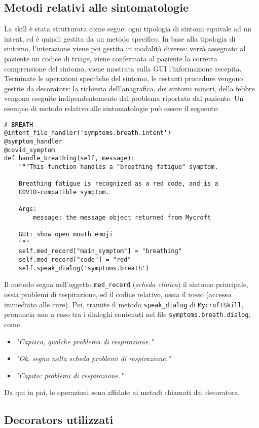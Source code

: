 \subsection{Metodi relativi alle sintomatologie}
La skill è stata strutturata come segue: ogni tipologia di sintomi equivale ad un intent, ed è quindi gestita da un metodo specifico. In base alla tipologia di sintomo, l'interazione viene poi gestita in modalità diverse: verrà assegnato al paziente un codice di triage, viene confermata al paziente la corretta comprensione del sintomo, viene mostrata sulla GUI l'informazione recepita. Terminate le operazioni specifiche del sintomo, le restanti procedure vengono gestite da decorators: la richiesta dell'anagrafica, dei sintomi minori, della febbre vengono eseguite indipendentemente dal problema riportato dal paziente. Un esempio di metodo relativo alle sintomatologie può essere il seguente:
\begin{verbatim}
# BREATH
@intent_file_handler('symptoms.breath.intent')
@symptom_handler
@covid_symptom
def handle_breathing(self, message):
    """This function handles a "breathing fatigue" symptom.

    Breathing fatigue is recognized as a red code, and is a
    COVID-compatible symptom.

    Args:
        message: the message object returned from Mycroft

    GUI: show open mouth emoji
    """
    self.med_record["main_symptom"] = "breathing"
    self.med_record["code"] = "red"
    self.speak_dialog('symptoms.breath')
\end{verbatim}
Il metodo segna nell'oggetto \texttt{med\_record} (\textit{scheda clinica}) il sintomo principale, ossia problemi di respirazione, ed il codice relativo, ossia il rosso (accesso immediato alle cure). Poi, tramite il metodo \texttt{speak\_dialog} di \texttt{MycroftSkill}, pronuncia uno a caso tra i dialoghi contenuti nel file \texttt{symptoms.breath.dialog}, come
\begin{itemize}
    \item \textit{"Capisco, qualche problema di respirazione."}
    \item \textit{"Ok, segno nella scheda problemi di respirazione."}
    \item \textit{"Capito: problemi di respirazione."}
\end{itemize}
Da qui in poi, le operazioni sono affidate ai metodi chiamati dai decorators.
\subsection{Decorators utilizzati}
